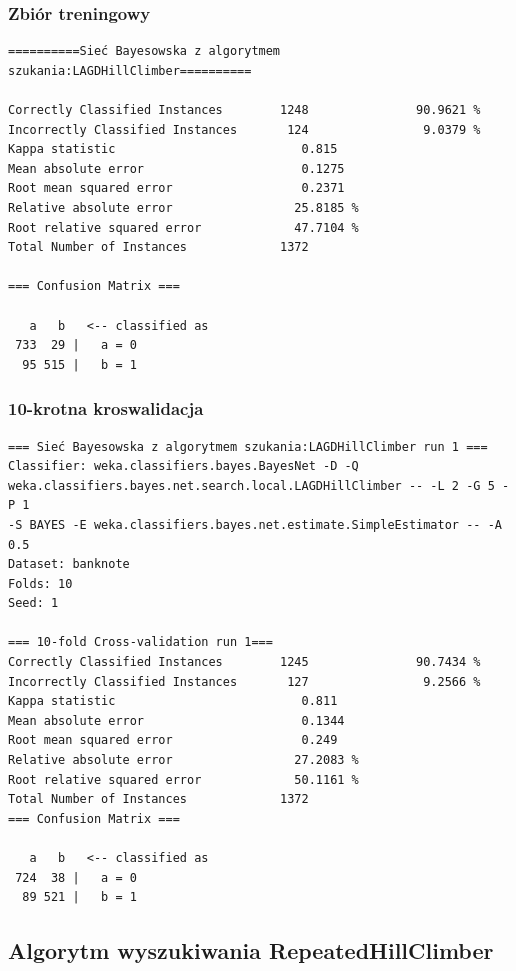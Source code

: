 \documentclass{classrep}
\begin{document}
\subsubsection*{Zbiór treningowy}
\scriptsize 
\begin{verbatim}
==========Sieć Bayesowska z algorytmem szukania:LAGDHillClimber==========

Correctly Classified Instances        1248               90.9621 %
Incorrectly Classified Instances       124                9.0379 %
Kappa statistic                          0.815 
Mean absolute error                      0.1275
Root mean squared error                  0.2371
Relative absolute error                 25.8185 %
Root relative squared error             47.7104 %
Total Number of Instances             1372     

=== Confusion Matrix ===

   a   b   <-- classified as
 733  29 |   a = 0
  95 515 |   b = 1
\end{verbatim} 
\normalsize
\subsubsection*{10-krotna kroswalidacja}
\scriptsize 
\begin{verbatim}
=== Sieć Bayesowska z algorytmem szukania:LAGDHillClimber run 1 ===
Classifier: weka.classifiers.bayes.BayesNet -D -Q
weka.classifiers.bayes.net.search.local.LAGDHillClimber -- -L 2 -G 5 -P 1
-S BAYES -E weka.classifiers.bayes.net.estimate.SimpleEstimator -- -A 0.5
Dataset: banknote
Folds: 10
Seed: 1

=== 10-fold Cross-validation run 1===
Correctly Classified Instances        1245               90.7434 %
Incorrectly Classified Instances       127                9.2566 %
Kappa statistic                          0.811 
Mean absolute error                      0.1344
Root mean squared error                  0.249 
Relative absolute error                 27.2083 %
Root relative squared error             50.1161 %
Total Number of Instances             1372     
=== Confusion Matrix ===

   a   b   <-- classified as
 724  38 |   a = 0
  89 521 |   b = 1
\end{verbatim} 
\normalsize

\subsection{Algorytm wyszukiwania RepeatedHillClimber}
\end{document}
